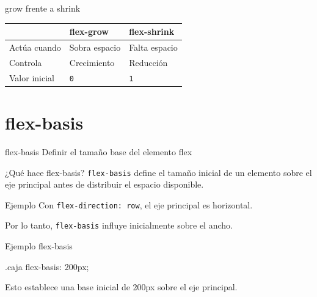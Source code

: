 \documentclass[aspectratio=169,11.5pt]{beamer}
\begin{document}
    \begin{frame}{grow frente a shrink}
        \begin{center}
            \begin{tabular}{p{3cm}p{3.5cm}p{3.5cm}}
                \toprule
                & \textbf{flex-grow} & \textbf{flex-shrink} \\
                \midrule

                Actúa cuando &
                Sobra espacio &
                Falta espacio \\

                Controla &
                Crecimiento &
                Reducción \\

                Valor inicial &
                \texttt{0} &
                \texttt{1} \\

                \bottomrule
            \end{tabular}
        \end{center}
    \end{frame}



    \section{flex-basis}

    \SectionSlide
    {flex-basis}
    {Definir el tamaño base del elemento flex}

    \begin{frame}{¿Qué hace flex-basis?}
        \texttt{flex-basis} define el tamaño inicial
        de un elemento sobre el eje principal
        antes de distribuir el espacio disponible.

        \begin{block}{Ejemplo}
            Con \texttt{flex-direction: row},
            el eje principal es horizontal.

            Por lo tanto, \texttt{flex-basis}
            influye inicialmente sobre el ancho.
        \end{block}
    \end{frame}

    \begin{frame}[fragile]{Ejemplo flex-basis}
        \begin{csscodedark}
            .caja {
                flex-basis: 200px;
            }
        \end{csscodedark}

        Esto establece una base inicial
        de 200px sobre el eje principal.
    \end{frame}
\end{document}

